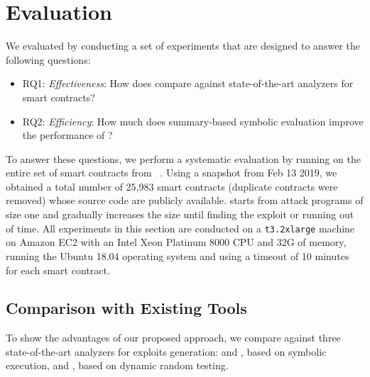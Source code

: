 \section{Evaluation}\label{sec:eval}
We evaluated \toolname by conducting a set of experiments that are designed to answer the following questions: 
\begin{itemize}
\item RQ1: \emph{Effectiveness}: How does \toolname compare against state-of-the-art analyzers for smart contracts?
\item RQ2: \emph{Efficiency}: How much does summary-based symbolic 
evaluation improve the performance of \toolname?
\end{itemize}

To answer these questions, we perform a systematic evaluation by running
\toolname on the entire set of smart contracts from \etherscan~\cite{etherscan}.
Using a snapshot from Feb 13 2019, we obtained a total number of 25,983 smart
contracts (duplicate contracts were removed) whose source code are publicly available. \toolname starts from attack programs of size one and gradually increases
the size until finding the exploit or running out of time. All experiments in this section are
conducted on a \texttt{t3.2xlarge} machine on Amazon EC2 with an Intel Xeon
Platinum 8000 CPU and 32G of memory, running the Ubuntu 18.04 operating system
and using a timeout of 10 minutes for each smart contract.

\subsection{Comparison with Existing Tools}\label{sec:comp}
To show the advantages of our proposed approach, we compare \toolname against three
state-of-the-art analyzers for exploits generation: \mythril and \teether, based on 
symbolic execution, and \contractfuzz, based on dynamic random testing.





% 
